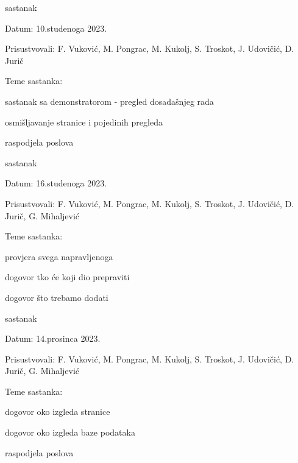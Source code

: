 \begin{packed_enum}
			\item  sastanak
			\item[] \begin{packed_item}
				\item Datum: 10.studenoga 2023.
				\item Prisustvovali: F. Vuković, M. Pongrac, M. Kukolj, S. Troskot, J. Udovičić, D. Jurič
				\item Teme sastanka:
				\begin{packed_item}
					\item  sastanak sa demonstratorom - pregled dosadašnjeg rada
					\item  osmišljavanje stranice i pojedinih pregleda
					\item raspodjela poslova 
				\end{packed_item}
			\end{packed_item}

			\item  sastanak
			\item[] \begin{packed_item}
				\item Datum: 16.studenoga 2023.
				\item Prisustvovali: F. Vuković, M. Pongrac, M. Kukolj, S. Troskot, J. Udovičić, D. Jurič, G. Mihaljević
				\item Teme sastanka:
				\begin{packed_item}
					\item  provjera svega napravljenoga
					\item dogovor tko će koji dio prepraviti 
					\item dogovor što trebamo dodati
				\end{packed_item}
			\end{packed_item}

			\item  sastanak
			\item[] \begin{packed_item}
				\item Datum: 14.prosinca 2023.
				\item Prisustvovali: F. Vuković, M. Pongrac, M. Kukolj, S. Troskot, J. Udovičić, D. Jurič, G. Mihaljević
				\item Teme sastanka:
				\begin{packed_item}
					\item dogovor oko izgleda stranice
					\item dogovor oko izgleda baze podataka
					\item raspodjela poslova
				\end{packed_item}
			\end{packed_item}


\end{packed_enum}
